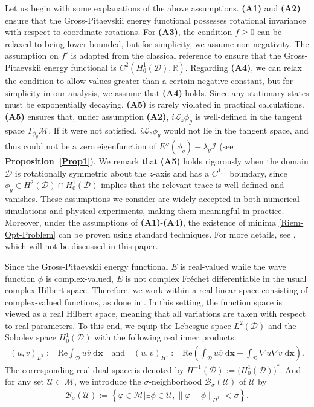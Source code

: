 \documentclass[preprint,3p]{elsarticle}
\begin{document}
Let us begin with some explanations of the above assumptions. {\bf (A1)} and {\bf (A2)} ensure that the Gross-Pitaevskii energy functional possesses rotational invariance with respect to coordinate rotations. For  {\bf (A3)}, the condition $f\ge0$ can be relaxed to being lower-bounded, but for simplicity, we assume non-negativity. The assumption on  $f'$ is adapted from the classical reference \cite{2003Semi} to ensure that the Gross-Pitaevskii energy functional is $C^2(H^1_0(\mathcal{D}),\mathbb{R})$. Regarding {\bf (A4)}, we can relax the condition to allow values greater than a certain negative constant, but for simplicity in our analysis, we assume that {\bf (A4)} holds. Since any stationary states must be exponentially decaying, {\bf (A5)} is rarely violated in practical calculations. {{\bf (A5)} ensures that, under assumption {\bf (A2)}, $i\mathcal{L}_z\phi_g$ is well-defined in the tangent space $T_{\phi_g}\mathcal{M}$. If it were not satisfied, $i\mathcal{L}_z\phi_g$ would not lie in the tangent space, and thus could not be a zero eigenfunction of $E''(\phi_g) - \lambda_g\mathcal{I}$ (see {\bf Proposition~\ref{Prop1}}).} {We remark that {\bf (A5)} holds rigorously when the domain $\mathcal{D}$ is rotationally symmetric about the $z$-axis and has a $C^{1,1}$ boundary, since $\phi_g \in H^2(\mathcal{D}) \cap H_0^1(\mathcal{D})$ implies that the relevant trace is well defined and vanishes.} These assumptions we consider are widely accepted in both numerical simulations and physical experiments, making them meaningful in practice. Moreover, under the assumptions of {\bf (A1)}-{\bf (A4)}, the existence of minima \eqref{Riem-Opt-Problem} can be proven using standard techniques. For more details, see \cite{2013Mathematical}, which will not be discussed in this paper.

Since the Gross-Pitaevskii energy functional \(E\) is real-valued while the wave function \(\phi\) is complex-valued, \(E\) is not complex Fr\'echet differentiable in the usual complex Hilbert space. Therefore, we work within a real-linear space consisting of complex-valued functions, as done in \cite{2021The, 2003Semi}. In this setting, the function space is viewed as a real Hilbert space, meaning that all variations are taken with respect to real parameters. To this end, we equip the Lebesgue space \(L^2(\mathcal{D})\) and the Sobolev space \(H^1_0(\mathcal{D})\) with the following real inner products:
\begin{align*}
	(u,v)_{L^2}:=\text{Re}\int_{\mathcal{D}}u \overline{v}\;\text{d}\bm{x}\quad \text{and}\quad (u,v)_{H^1}:=\text{Re}\left(\int_{\mathcal{D}}u \overline{v}\;\text{d}\bm{x}+\int_{\mathcal{D}}\nabla u \overline{\nabla v}\;\text{d}\bm{x}\right).
\end{align*}
The corresponding real dual space is denoted
by $H^{-1}(\mathcal{D}):=\big(H^1_0(\mathcal{D})\big)^*$. And for any set $\mathcal{U}\subset\mathcal{M}$, we introduce the $\sigma$-neighborhood $\mathcal{B}_{\sigma}(\mathcal{U})$ of $\mathcal{U}$ by
\begin{align}
	\mathcal{B}_{\sigma}(\mathcal{U}):=\left\{\varphi\in\mathcal{M}\big|\exists\phi\in\mathcal{U},\|\varphi-\phi\|_{H^1}<\sigma\right\}.
\end{align}
\end{document}
